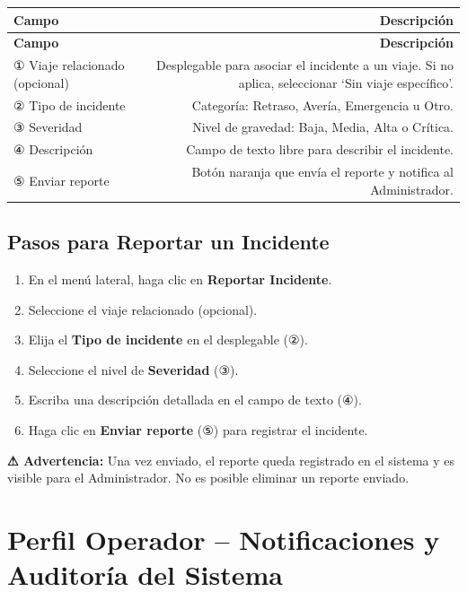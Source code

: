 \documentclass[12pt,a4paper]{article}
\begin{document}
\begin{longtable}{LR}
  \toprule
  \textbf{Campo} & \textbf{Descripción} \\
  \midrule
  \endfirsthead
  \toprule
  \textbf{Campo} & \textbf{Descripción} \\
  \midrule
  \endhead
  \bottomrule
  \endfoot
  ① Viaje relacionado (opcional) & Desplegable para asociar el incidente a un viaje. Si no aplica, seleccionar `Sin viaje específico'. \\[4pt]
  ② Tipo de incidente            & Categoría: Retraso, Avería, Emergencia u Otro. \\[4pt]
  ③ Severidad                   & Nivel de gravedad: Baja, Media, Alta o Crítica. \\[4pt]
  ④ Descripción                 & Campo de texto libre para describir el incidente. \\[4pt]
  ⑤ Enviar reporte              & Botón naranja que envía el reporte y notifica al Administrador. \\
\end{longtable}

\subsection{Pasos para Reportar un Incidente}

\begin{enumerate}[leftmargin=1.5em]
  \item En el menú lateral, haga clic en \textbf{Reportar Incidente}.
  \item Seleccione el viaje relacionado (opcional).
  \item Elija el \textbf{Tipo de incidente} en el desplegable (②).
  \item Seleccione el nivel de \textbf{Severidad} (③).
  \item Escriba una descripción detallada en el campo de texto (④).
  \item Haga clic en \textbf{Enviar reporte} (⑤) para registrar el incidente.
\end{enumerate}

\begin{advertenciabox}
\textbf{⚠ Advertencia:} Una vez enviado, el reporte queda registrado en el sistema y es visible para el Administrador. No es posible eliminar un reporte enviado.
\end{advertenciabox}

\section{Perfil Operador -- Notificaciones y Auditoría del Sistema}
\end{document}
